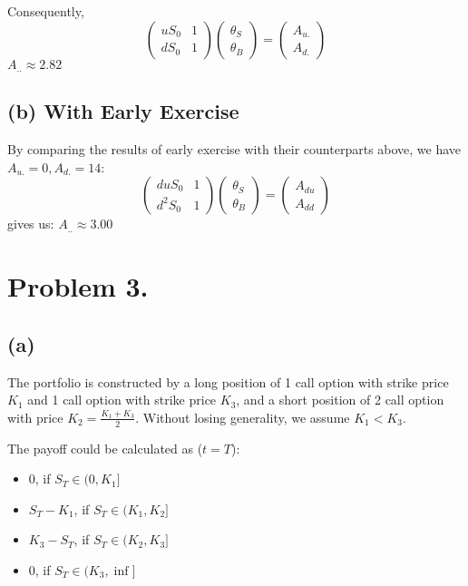 \documentclass{article}
\begin{document}
Consequently, 
\begin{equation}
  \begin{pmatrix}
  uS_0 & 1\\
  dS_0 & 1
  \end{pmatrix}
  \begin{pmatrix}
    \theta_S\\
    \theta_B
  \end{pmatrix}
  =
  \begin{pmatrix}
    A_{u.}\\
    A_{d.}
  \end{pmatrix}
\end{equation}
$A_{..}\approx 2.82$

\subsection{(b) With Early Exercise}
By comparing the results of early exercise with their counterparts above, we have $A_{u.}=0, A_{d.}=14$: 
\begin{equation}
  \begin{pmatrix}
  duS_0 & 1\\
  d^2S_0 & 1
  \end{pmatrix}
  \begin{pmatrix}
    \theta_S\\
    \theta_B
  \end{pmatrix}
  =
  \begin{pmatrix}
    A_{du}\\
    A_{dd}
  \end{pmatrix}
\end{equation}
gives us: $A_{..} \approx 3.00$

\section{Problem 3.}
\subsection{(a)}
The portfolio is constructed by a long position of 1 call option with strike price $K_1$ and 1 call option with strike price $K_3$, and a short position of 2 call option with price $K_2 = \frac{K_1+K_3}{2}$. Without losing generality, we assume $K_1<K_3$.

The payoff could be calculated as ($t=T$):
\begin{itemize}
   \item $0$, if $S_T \in (0,K_1]$
   \item $S_T-K_1$, if $S_T \in (K_1,K_2]$
   \item $K_3-S_T$, if $S_T \in (K_2,K_3]$
   \item $0$, if $S_T \in (K_3,\inf]$
 \end{itemize} 
\end{document}
